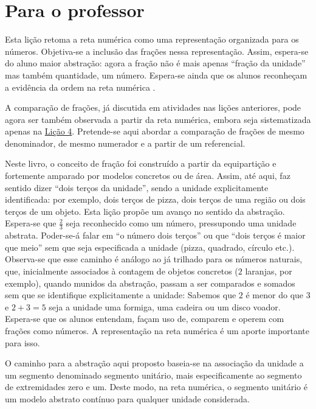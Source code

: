\chapter{Para o professor}\label{chap3}

Esta lição retoma a reta numérica como uma representação organizada para os números. Objetiva-se a inclusão das frações nessa representação. Assim, espera-se do aluno maior abstração: agora a fração não é mais apenas ``fração da unidade'' mas também quantidade, um número. Espera-se ainda que os alunos reconheçam a evidência da ordem na reta numérica .

A comparação de frações, já discutida em atividades nas lições anteriores, pode agora ser também observada a partir da reta numérica, embora seja sistematizada apenas na \hyperref[chap4]{Lição 4}. Pretende-se aqui abordar a comparação de frações de mesmo denominador, de mesmo numerador e a partir de um referencial. 

Neste livro, o conceito de fração foi construído a partir da equipartição e fortemente amparado por modelos concretos ou de área. Assim, até aqui, faz sentido dizer ``dois terços da unidade'', sendo a unidade explicitamente identificada: por exemplo, dois terços de pizza, dois terços de uma região ou dois terços de um objeto. Esta lição propõe um avanço no sentido da abstração. Espera-se que $\frac{2}{3}$ seja reconhecido como um número, pressupondo uma unidade abstrata. Poder-se-á falar em ``o número dois terços'' ou que ``dois terços é maior que meio'' sem que seja especificada a unidade (pizza, quadrado, círculo etc.). Observa-se que esse caminho é análogo ao já trilhado para os números naturais, que, inicialmente associados à contagem de objetos concretos ($2$ laranjas, por exemplo), quando munidos da abstração, passam a ser comparados e somados sem que se identifique explicitamente a unidade: Sabemos que $2$ é menor do que $3$ e $2 + 3 = 5$ seja a unidade uma formiga, uma cadeira ou um disco voador. Espera-se que os alunos entendam, façam uso de, comparem e operem com frações como números. A representação na reta numérica é um aporte importante para isso.

O caminho para a abstração aqui proposto baseia-se na associação da unidade a um segmento denominado segmento unitário, mais especificamente ao segmento de extremidades zero e um. Deste modo, na reta numérica, o segmento unitário é um modelo abstrato contínuo para qualquer unidade considerada.
\vspace{.2cm}


